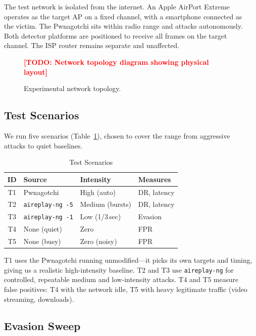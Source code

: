 \documentclass[conference]{IEEEtran}
\newcommand{\placeholder}[1]{\textcolor{red}{\textbf{[TODO: #1]}}}
\begin{document}
The test network is isolated from the internet. An Apple AirPort Extreme operates as the target AP on a fixed channel, with a smartphone connected as the victim. The Pwnagotchi sits within radio range and attacks autonomously. Both detector platforms are positioned to receive all frames on the target channel. The ISP router remains separate and unaffected.

\begin{figure}[htbp]
\centering
\placeholder{Network topology diagram showing physical layout}
\caption{Experimental network topology.}
\label{fig:topology}
\end{figure}

\subsection{Test Scenarios}

We run five scenarios (Table~\ref{tab:tests}), chosen to cover the range from aggressive attacks to quiet baselines.

\begin{table}[htbp]
\caption{Test Scenarios}
\label{tab:tests}
\centering
\small
\begin{tabular}{@{}clll@{}}
\toprule
\textbf{ID} & \textbf{Source} & \textbf{Intensity} & \textbf{Measures} \\
\midrule
T1 & Pwnagotchi & High (auto) & DR, latency \\
T2 & \texttt{aireplay-ng -5} & Medium (bursts) & DR, latency \\
T3 & \texttt{aireplay-ng -1} & Low (1/3\,sec) & Evasion \\
T4 & None (quiet) & Zero & FPR \\
T5 & None (busy) & Zero (noisy) & FPR \\
\bottomrule
\end{tabular}
\end{table}

T1 uses the Pwnagotchi running unmodified---it picks its own targets and timing, giving us a realistic high-intensity baseline. T2 and T3 use \texttt{aireplay-ng} for controlled, repeatable medium and low-intensity attacks. T4 and T5 measure false positives: T4 with the network idle, T5 with heavy legitimate traffic (video streaming, downloads).

\subsection{Evasion Sweep}
\end{document}
